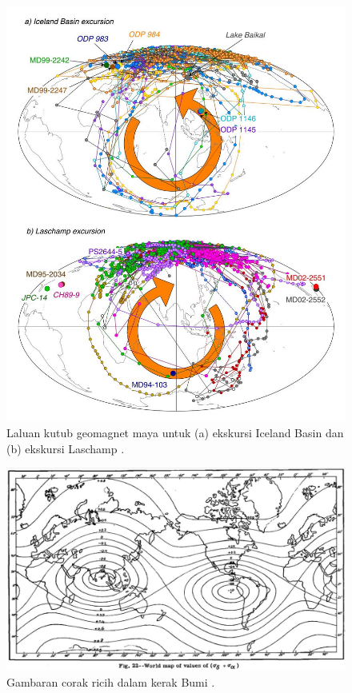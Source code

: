 \documentclass[10pt,twocolumn,letterpaper]{article}
\begin{document}
\begin{figure}[t]
\begin{center}
   \includegraphics[width=0.95\linewidth]{laj.jpg}
\end{center}
   \caption{Laluan kutub geomagnet maya untuk (a) ekskursi Iceland Basin dan (b) ekskursi Laschamp \cite{35}.}
\label{fig:7}
\label{fig:onecol}
\end{figure}

\begin{figure}[t]
\begin{center}
   \includegraphics[width=1\linewidth]{meinesz3.jpg}
\end{center}
   \caption{Gambaran corak ricih dalam kerak Bumi \cite{36}.}
\label{fig:8}
\label{fig:onecol}
\end{figure}
\end{document}
